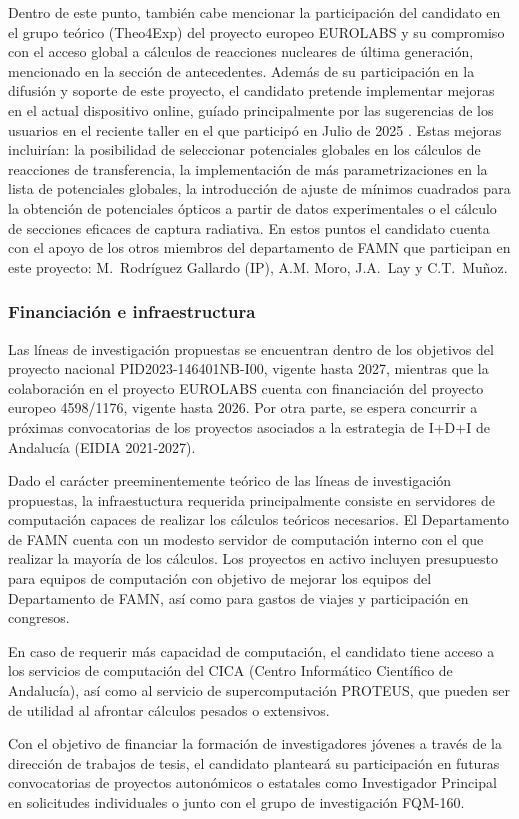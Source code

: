 \documentclass[a4paper,12pt,twoside]{article}
\begin{document}
Dentro de este punto, también cabe mencionar la participación del candidato en el grupo teórico (Theo4Exp) del proyecto europeo EUROLABS \cite{eurolabs} y su compromiso con el acceso global a cálculos de reacciones nucleares de última generación, mencionado en la sección de antecedentes. Además de su participación en la difusión y soporte de este proyecto, el candidato pretende implementar mejoras en el actual dispositivo online, guíado principalmente por las sugerencias de los usuarios en el reciente taller en el que participó en Julio de 2025 \cite{Workshop_Trento_25}. Estas mejoras incluirían: la posibilidad de seleccionar potenciales globales en los cálculos de reacciones de transferencia, la implementación de más parametrizaciones en la lista de potenciales globales, la introducción de ajuste de mínimos cuadrados para la obtención de potenciales ópticos a partir de datos experimentales o el cálculo de secciones eficaces de captura radiativa. En estos puntos el candidato cuenta con el apoyo de los otros miembros del departamento de FAMN que participan en este proyecto: M.~Rodríguez Gallardo (IP), A.M. Moro, J.A.~Lay y C.T.~Muñoz.

\subsubsection{Financiación e infraestructura}

Las líneas de investigación propuestas se encuentran dentro de los objetivos del proyecto nacional PID2023-146401NB-I00, vigente hasta 2027, mientras que la colaboración en el proyecto EUROLABS cuenta con financiación del proyecto europeo 4598/1176, vigente hasta 2026. Por otra parte, se espera concurrir a próximas convocatorias de los proyectos asociados a la estrategia de I+D+I de Andalucía (EIDIA 2021-2027).

Dado el carácter preeminentemente teórico de las líneas de investigación propuestas, la infraestuctura requerida principalmente consiste en servidores de computación capaces de realizar los cálculos teóricos necesarios. El Departamento de FAMN cuenta con un modesto servidor de computación interno con el que realizar la mayoría de los cálculos. Los proyectos en activo incluyen presupuesto para equipos de computación con objetivo de mejorar los equipos del Departamento de FAMN, así como para gastos de viajes y participación en congresos. 

En caso de requerir más capacidad de computación, el candidato tiene acceso a los servicios de computación del CICA (Centro Informático
Científico de Andalucía), así como al servicio de supercomputación PROTEUS, que pueden ser de utilidad al afrontar cálculos pesados o extensivos.

Con el objetivo de financiar la formación de investigadores jóvenes a través de la dirección de trabajos de tesis, el candidato planteará su participación en futuras convocatorias de proyectos autonómicos o estatales como Investigador Principal en solicitudes individuales o junto con el grupo de investigación FQM-160.

%


\end{document}
